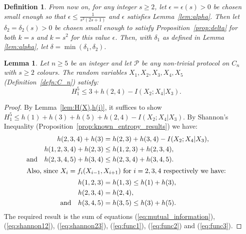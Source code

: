 \documentclass{birkjour}
\newtheorem{lem}[thm]{Lemma}
\theoremstyle{indenteddefinition}
\newtheorem{defn}[thm]{Definition}
\theoremstyle{indenteddefinition}
\numberwithin{equation}{section}
\renewcommand{\Pr}{\mathcal{P}}
\begin{document}
\begin{defn}
\label{defn:epsilon,delta} 
From now on, for any integer $s \geq 2$, let $\epsilon = \epsilon(s) >0$ be chosen small enough so that $\epsilon \leq \frac{1}{s^2(2s+1)}$ and $\epsilon$ satisfies Lemma~\ref{lem:alpha}. Then let $\delta_2 = \delta_2(s) >0$ be chosen small enough to satisfy Proposition~\ref{prop:delta} for both $k=s$ and $k=s^2$ for this value $\epsilon$. Then, with $\delta_1$ as defined in Lemma \ref{lem:alpha}, let $\delta= \min (\delta_1,\delta_2)$.
\end{defn}

\begin{lem}
\label{lem:shannon}
Let $n \geq 5$ be an integer and let $\Pr$ be any non-trivial protocol on $C_n$ with $s \geq 2$ colours. The random variables $X_1,X_2,X_3,X_4,X_5$ (Definition~\ref{defn:C_n}) satisfy:
	$$ H_1^5 \leq 3+h(2,4) - I(X_2;X_4|X_3). $$
\end{lem}
\begin{proof}
By Lemma~\ref{lem:H(X),h(i)}, it suffices to show $H_1^5 \leq h(1)+h(3)+h(5)+h(2,4) - I(X_2;X_4|X_3)$. By Shannon's Inequality (Proposition~\ref{prop:known_entropy_results}) we have:
	\begin{align}
	h(2,3,4) + h(3) & = h(2,3) + h(3,4) - I(X_2;X_4|X_3), \label{eq:mutual_information} \\
	h(1,2,3,4) + h(2,3) & \leq h(1,2,3) + h(2,3,4), \label{eq:shannon12} \\
	\mbox{and} \quad h(2,3,4,5) + h(3,4) & \leq h(2,3,4) + h(3,4,5). \label{eq:shannon23} \\
\intertext{Also, since $X_i = f_i(X_{i-1},X_{i+1})$ for $i=2,3,4$ respectively we have:}
	h(1,2,3) &= h(1,3)  \leq h(1) + h(3), \label{eq:func1} \\
	h(2,3,4) & = h(2,4), \label{eq:func2} \\
	\mbox{and} \quad h(3,4,5) &= h(3,5)  \leq h(3) + h(5). \label{eq:func3} 	
	\end{align}
The required result is the sum of equations (\ref{eq:mutual_information}), (\ref{eq:shannon12}), (\ref{eq:shannon23}), (\ref{eq:func1}), (\ref{eq:func2}) and (\ref{eq:func3}).
\end{proof}
\end{document}
